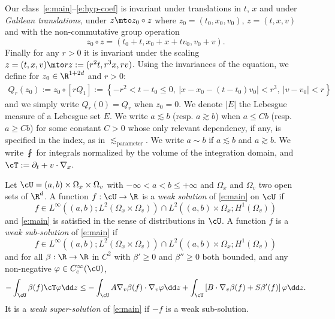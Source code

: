 Our class~\eqref{e:main}--\eqref{e:hyp-coef} is invariant under
translations in $t$, $x$ and under \emph{Galilean translations},
\ie under $z \mto z_0 \circ z$ where $z_0 =(t_0,x_0,v_0)$,
$z = (t,x,v)$ and with the non-commutative group operation
\begin{equation*}
z_0 \circ z = (t_0+t,x_0+x + t v_0, v_0 + v).
\end{equation*}
Finally for any $r>0$ it is invariant under the scaling
$z=(t,x,v) \mto rz := (r^2t,r^3x,r v)$. Using the invariances of
the equation, we define for $z_0 \in \R^{1+2d}$ and $r>0$:
\begin{align*}
Q_r(z_0) := z_0 \circ \left[ r Q_1 \right]
:= \left\{ -r^2 <t-t_0 \le 0, \ |x - x_0- (t-t_0)v_0|
< r^3, \ |v-v_0| < r \right\}
\end{align*}
and we simply write $Q_r(0)=Q_r$ when $z_0=0$. We denote $|E|$
the Lebesgue measure of a Lebesgue set $E$. We write
$a \lesssim b$ (resp. $a \gtrsim b$) when $a \le Cb$ (resp.
$a \ge Cb$) for some constant $C>0$ whose only relevant
dependency, if any, is specified in the index, as in
$\lesssim_{\text{parameter}}$. We write $a\sim b$ if
$a \lesssim b$ and $a \gtrsim b$. We write $\fint$ for integrals
normalized by the volume of the integration domain, and
$\cT:=\partial_t+v\cdot \nabla_x$.

\skpt
\begin{definition}
\label{d:weak}
Let $\cU = (a,b) \times \Omega_x \times \Omega_v$ with
$-\infty<a < b \le +\infty$ and $\Omega_x$ and $\Omega_v$ two
open sets of $\R^d$. A function $f: \cU \to \R$ is a \emph{weak
solution} of \eqref{e:main} on $\cU$ if
\[
f \in L^\infty ((a,b);L^2 (\Omega_x \times \Omega_v)) \cap L^2
((a,b) \times \Omega_x;H^1(\Omega_v))
\]
and \eqref{e:main} is
satisfied in the sense of distributions in $\cU$. A function
$f$ is a \emph{weak sub-solution} of \eqref{e:main} if
\[
f \in L^\infty ((a,b);L^2 (\Omega_x \times \Omega_v)) \cap L^2
((a,b) \times \Omega_x;H^1(\Omega_v))
\]
and for all
$\beta : \R \to \R$ in $C^2$ with $\beta' \ge 0$ and
$\beta'' \ge 0$ both bounded, and any non-negative
$\varphi \in C^\infty_c (\cU)$,
\begin{equation*}
- \int_\cU \beta(f) \cT \varphi \dd z
\le - \int_{\cU} A \nabla_v \beta(f) \cdot \nabla_v \varphi \dd
z + \int_{\cU} \left[ B \cdot \nabla_v \beta(f)+S \beta'(f)
\right] \varphi \dd z.
\end{equation*}
It is a \emph{weak super-solution} of \eqref{e:main} if $-f$ is
a weak sub-solution.
\end{definition}


